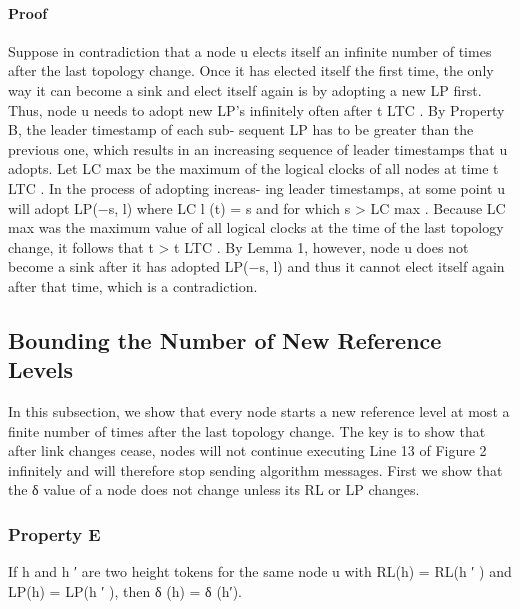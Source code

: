 \documentclass{article}
\begin{document}
\paragraph{Proof}
Suppose in contradiction that a node u elects itself
an infinite number of times after the last topology change.
Once it has elected itself the first time, the only way it can
become a sink and elect itself again is by adopting a new LP
first. Thus, node u needs to adopt new LP’s infinitely often
after t LTC . By Property B, the leader timestamp of each sub-
sequent LP has to be greater than the previous one, which
results in an increasing sequence of leader timestamps that
u adopts. Let LC max be the maximum of the logical clocks
of all nodes at time t LTC . In the process of adopting increas-
ing leader timestamps, at some point u will adopt LP(−s, l)
where LC l (t) = s and for which s > LC max . Because LC max
was the maximum value of all logical clocks at the time
of the last topology change, it follows that t > t LTC . By
Lemma 1, however, node u does not become a sink after it
has adopted LP(−s, l) and thus it cannot elect itself again
after that time, which is a contradiction.

\subsection{Bounding the Number of New Reference Levels}
In this subsection, we show that every node starts a
new reference level at most a finite number of times after
the last topology change. The key is to show that after
link changes cease, nodes will not continue executing Line
13 of Figure 2 infinitely and will therefore stop sending
algorithm messages. First we show that the δ value of a
node does not change unless its RL or LP changes.
\subsubsection{Property E}
If h and h ′ are two height tokens for the same
node u with RL(h) = RL(h ′ ) and LP(h) = LP(h ′ ), then
δ (h) = δ (h′).\\
\end{document}
